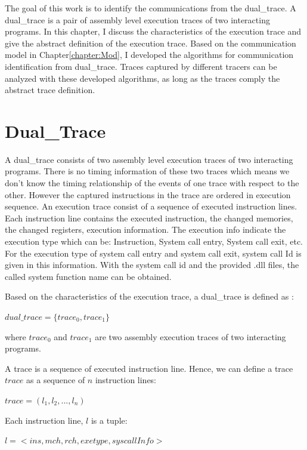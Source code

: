 


\label{chapter:alo}
The goal of this work is to identify the communications from the dual\_trace. A dual\_trace is a pair of assembly level execution traces of two interacting programs. In this chapter, I discuss the characteristics of the execution trace and give the abstract definition of the execution trace. Based on the communication model in Chapter\ref{chapter:Mod}, I developed the algorithms for communication identification from dual\_trace. Traces captured by different tracers can be analyzed with these developed algorithms, as long as the traces comply the abstract trace definition.

\section{Dual\_Trace}
A dual\_trace consists of two assembly level execution traces of two interacting programs. There is no timing information of these two traces which means we don't know the timing relationship of the events of one trace with respect to the other. However the captured instructions in the trace are ordered in execution sequence. An execution trace consist of a sequence of executed instruction lines. Each instruction line contains the executed instruction, the changed memories, the changed registers, execution information. The execution info indicate the execution type which can be: Instruction, System call entry, System call exit, etc. For the execution type of system call entry and system call exit, system call Id is given in this information. With the system call id and the provided .dll files, the called system function name can be obtained. 

Based on the characteristics of the execution trace, a dual\_trace is defined as :

$dual\_trace = \lbrace trace_0, trace_1\rbrace$

where $trace_0$ and $trace_1$ are two assembly execution traces of two interacting programs.

A trace is a sequence of executed instruction line. Hence, we can define a trace $trace$ as a sequence of $n$ instruction lines:

$ trace = (l_1, l_2, ..., l_n)$ 

Each instruction line, $l$ is a tuple:

$l = <ins, mch, rch, exetype, syscallInfo>$

